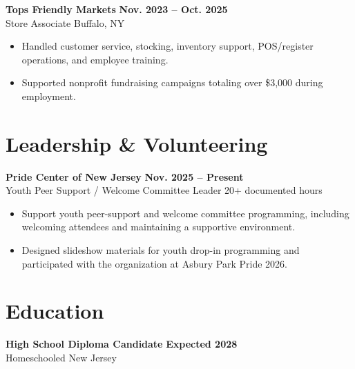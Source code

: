 \documentclass[10pt,letterpaper]{article}
\newcommand{\resumeItem}[1]{\item #1}
\newcommand{\resumeSubheading}[4]{%
  \textbf{#1} \hfill \textbf{#2}\\[-1pt]
  {\small #3} \hfill {\small #4}
}
\begin{document}
\resumeSubheading{Tops Friendly Markets}{Nov. 2023 -- Oct. 2025}{Store Associate}{Buffalo, NY}
\begin{itemize}
  \resumeItem{Handled customer service, stocking, inventory support, POS/register operations, and employee training.}
  \resumeItem{Supported nonprofit fundraising campaigns totaling over \$3,000 during employment.}
\end{itemize}

\section{Leadership \& Volunteering}

\resumeSubheading{Pride Center of New Jersey}{Nov. 2025 -- Present}{Youth Peer Support / Welcome Committee Leader}{20+ documented hours}
\begin{itemize}
  \resumeItem{Support youth peer-support and welcome committee programming, including welcoming attendees and maintaining a supportive environment.}
  \resumeItem{Designed slideshow materials for youth drop-in programming and participated with the organization at Asbury Park Pride 2026.}
\end{itemize}

\section{Education}

\resumeSubheading{High School Diploma Candidate}{Expected 2028}{Homeschooled}{New Jersey}

%
%
%
\end{document}
